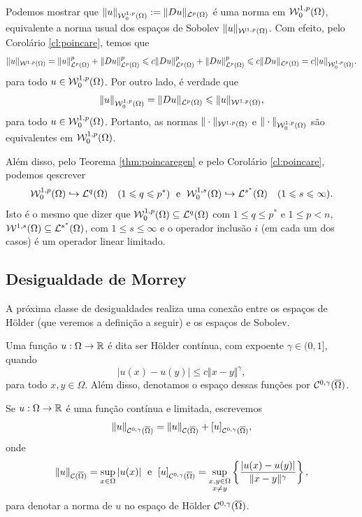 Podemos mostrar que $\Vert u \Vert_{\mathcal{W}_0^{1,p}(\Omega)} := \Vert Du \Vert_{\mathcal{L}^p(\Omega)}$ é uma norma em $\mathcal{W}^{1,p}_0(\Omega)$, equivalente a norma usual dos espaços de Sobolev $\Vert u \Vert_{\mathcal{W}^{1,p}(\Omega)}$. Com efeito, pelo Corolário \ref{cl:poincare}, temos que
\[
    \Vert u \Vert_{\mathcal{W}^{1,p}(\Omega)} = \Vert u \Vert_{\mathcal{L}^p(\Omega)}^p + \Vert Du \Vert_{\mathcal{L}^p(\Omega)}^p \leqslant c \Vert Du \Vert_{\mathcal{L}^p(\Omega)}^p + \Vert Du \Vert_{\mathcal{L}^p(\Omega)}^p \leqslant c \Vert Du \Vert_{\mathcal{L}^p(\Omega)} = c \Vert u \Vert_{\mathcal{W}^{1,p}_0(\Omega)}.
\]
para todo $u \in \mathcal{W}^{1,p}_0(\Omega)$.
Por outro lado, é verdade que
\[
    \Vert u \Vert_{\mathcal{W}^{1,p}_0(\Omega)} = \Vert Du \Vert_{\mathcal{L}^p(\Omega)} \leqslant \Vert u \Vert_{\mathcal{W}^{1,p}(\Omega)},
\]
para todo $u \in \mathcal{W}^{1,p}_0(\Omega)$.
Portanto, as normas $\Vert \cdot \Vert_{\mathcal{W}^{1,p}(\Omega)}$ e $\Vert \cdot \Vert_{\mathcal{W}^{1,p}_0(\Omega)}$ são equivalentes em $\mathcal{W}^{1,p}_0(\Omega)$.

Além disso, pelo Teorema \ref{thm:poincaregen} e pelo Corolário \ref{cl:poincare}, podemos qescrever 
\[
    \mathcal{W}^{1,p}_0(\Omega) \hookrightarrow \mathcal{L}^q(\Omega) \quad (1 \leqslant q \leqslant p^*) \;\text{ e }\; \mathcal{W}^{1,s}_0(\Omega) \hookrightarrow \mathcal{L}^{s^*}(\Omega) \quad (1 \leqslant s \leqslant \infty).
\]
Isto é o mesmo que dizer que $\mathcal{W}^{1,p}_0(\Omega) \subseteq \mathcal{L}^q(\Omega)$ com $1 \leqslant q \leqslant p^*$ e $1 \leqslant p < n$, $\mathcal{W}^{1,s}(\Omega) \subseteq \mathcal{L}^{s^*}(\Omega)$, com $1 \leqslant s \leqslant \infty$ e o operador inclusão $i$ (em cada um dos casos) é um operador linear limitado.

\subsection{Desigualdade de Morrey}

A próxima classe de desigualdades realiza uma conexão entre os espaços de Hölder (que veremos a definição a seguir) e os espaços de Sobolev.

\begin{dbox}
    Uma função $u : \Omega \to \mathbb{R}$ é dita ser Hölder contínua, com expoente $\gamma \in (0,1]$, quando
    \[
        |u(x) - u(y)| \leqslant c \Vert x - y \Vert^\gamma,
    \]
    para todo $x,y \in \Omega$. Além disso, denotamos o espaço dessas funções por $\mathcal{C}^{0,\gamma}(\overline\Omega)$.
\end{dbox}

\begin{dbox}
    Se $u : \Omega \to \mathbb{R}$ é uma função contínua e limitada, escrevemos
    \[
        \Vert u \Vert_{\mathcal{C}^{0,\gamma}(\overline\Omega)} = \Vert u \Vert_{\mathcal{C}(\overline\Omega)} + [u]_{\mathcal{C}^{0,\gamma}(\overline\Omega)},
    \]
    onde
    \[
        \Vert u \Vert_{\mathcal{C}(\overline\Omega)} = \sup_{x \in \Omega} |u(x)| \;\text{ e }\; [u]_{\mathcal{C}^{0,\gamma}(\overline\Omega)} = \sup_{\substack{x,y \in \Omega\\x \neq y}} \left\{ \frac{|u(x) - u(y)|}{\Vert x - y \Vert^\gamma} \right\},
    \]
    para denotar a norma de $u$ no espaço de Hölder $\mathcal{C}^{0,\gamma}(\overline\Omega)$.
\end{dbox}

